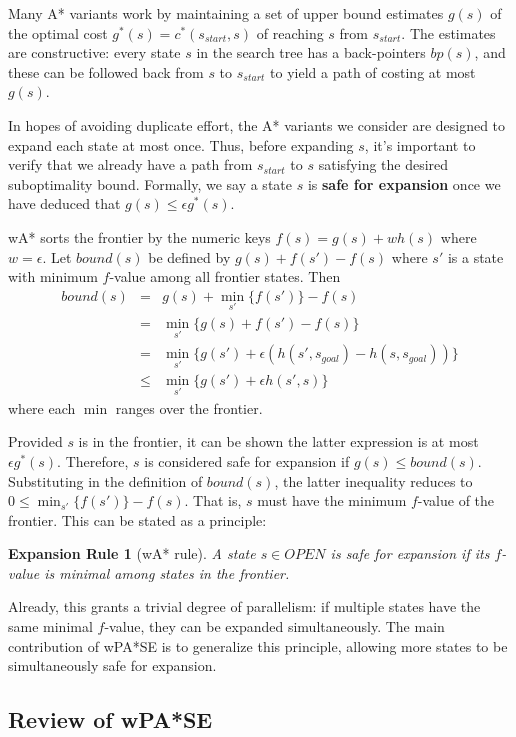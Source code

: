\documentclass[letterpaper]{article}
\newtheorem{rul}{Expansion Rule}
\begin{document}
Many A* variants work by maintaining a set of upper bound estimates $g(s)$ of the optimal cost $g^*(s) = c^*(s_{start},s)$ of reaching $s$ from $s_{start}$. The estimates are constructive: every state $s$ in the search tree has a back-pointers $bp(s)$, and these can be followed back from $s$ to $s_{start}$ to yield a path of costing at most $g(s)$.

In hopes of avoiding duplicate effort, the A* variants we consider are designed to expand each state at most once. Thus, before expanding $s$, it's important to verify that we already have a path from $s_{start}$ to $s$ satisfying the desired suboptimality bound. Formally, we say a state $s$ is \textbf{safe for expansion} once we have deduced that $g(s) \le \epsilon g^*(s)$.

wA* sorts the frontier by the numeric keys $f(s) = g(s) + wh(s)$ where $w = \epsilon$. Let $bound(s)$ be defined by $g(s) + f(s') - f(s)$ where $s'$ is a state with minimum $f$-value among all frontier states. Then
\begin{eqnarray*}
bound(s) &=& g(s) + \min_{s'}\{f(s')\} - f(s)
\\&=& \min_{s'}\{g(s) + f(s') - f(s)\}
\\&=& \min_{s'}\{g(s') + \epsilon\left(h(s',s_{goal}) - h(s,s_{goal})\right)\}
\\&\le& \min_{s'}\{g(s') + \epsilon h(s',s)\}
\end{eqnarray*}
where each $\min$ ranges over the frontier.

Provided $s$ is in the frontier, it can be shown the latter expression is at most $\epsilon g^*(s)$. Therefore, $s$ is considered safe for expansion if $g(s) \le bound(s)$. Substituting in the definition of $bound(s)$, the latter inequality reduces to $0 \le \min_{s'}\{f(s')\} - f(s)$. That is, $s$ must have the minimum $f$-value of the frontier. This can be stated as a principle:

\begin{rul}[wA* rule]
A state $s\in OPEN$ is safe for expansion if its $f$-value is minimal among states in the frontier.
\end{rul}

Already, this grants a trivial degree of parallelism: if multiple states have the same minimal $f$-value, they can be expanded simultaneously. The main contribution of wPA*SE is to generalize this principle, allowing more states to be simultaneously safe for expansion.

\subsection{Review of wPA*SE}
\end{document}
